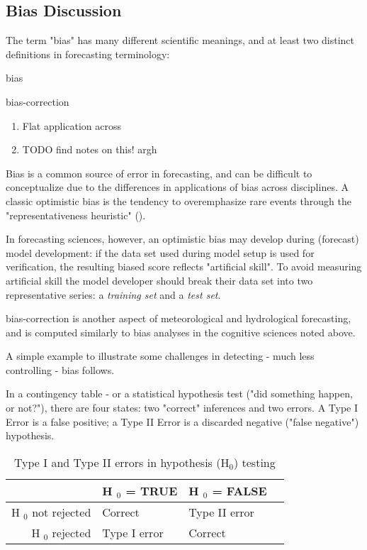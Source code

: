 \subsection{Bias Discussion}

The term "bias" has many different scientific meanings, and at least two distinct definitions in forecasting terminology:

\gls{bias}

\gls{bias-correction}


\begin{enumerate}
\item Flat application across 
\item TODO find notes on this! argh
\end{enumerate}

Bias is a common source of error in forecasting, and can be difficult to conceptualize due to the differences in applications of bias across disciplines. A classic optimistic bias is the tendency to overemphasize rare events through the "representativeness heuristic" (\autocite{kahneman2011thinking}). 

In forecasting sciences, however, an optimistic bias may develop  during (forecast) model development: if the data set used during model setup is used for verification, the resulting biased score reflects "artificial skill". To avoid measuring artificial skill the model developer should break their data set into two representative series: a \textit{training set} and a \textit{test set}. \autocite{JolliffeIanT.andStephenson2012ForecastVerification}

\gls{bias-correction} is another aspect of meteorological and hydrological forecasting, and is computed similarly to bias analyses in the cognitive sciences noted above.

A simple example to illustrate some challenges in detecting - much less controlling - bias follows.

In a contingency table - or a statistical hypothesis test ("did something happen, or not?"), there are four states: two "correct" inferences and two errors. A Type I Error is a false positive; a Type II Error is a discarded negative ("false negative") hypothesis.

\begin{table}[ht]
\centering
\caption{Type I and Type II errors in hypothesis (H$_{\text{0}}$) testing}
\label{tbl:type-i-ii-errors}
\begin{tabular}{r|p{5cm}|p{4cm}|p{4cm}|}
    \hline
     & H $_{\text{0}}$ = TRUE & H $_{\text{0}}$ = FALSE\\
    \hline
    H $_{\text{0}}$ not rejected & Correct & Type II error\\
    \hline
    H $_{\text{0}}$ rejected & Type I error & Correct\\
    \hline
\end{tabular}
\end{table}

